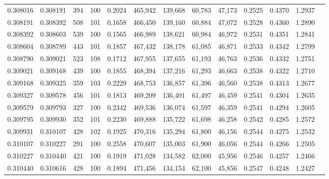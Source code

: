 \begin{tabular}{rrrrrrrrrrrrr}
0.308016 & 0.308191 &   394 & 100 &                                     0.2024 & 465,942 & 139,668 &  60,783 &  47,173 & 0.2525 & 0.4370 & 1.2937 \\
0.308191 & 0.308392 &   508 & 101 &                                     0.1658 & 466,450 & 139,160 &  60,884 &  47,072 & 0.2528 & 0.4360 & 1.2890 \\
0.308392 & 0.308603 &   539 & 100 &                                     0.1565 & 466,989 & 138,621 &  60,984 &  46,972 & 0.2531 & 0.4351 & 1.2841 \\
0.308604 & 0.308789 &   443 & 101 &                                     0.1857 & 467,432 & 138,178 &  61,085 &  46,871 & 0.2533 & 0.4342 & 1.2799 \\
0.308790 & 0.309021 &   523 & 108 &                                     0.1712 & 467,955 & 137,655 &  61,193 &  46,763 & 0.2536 & 0.4332 & 1.2751 \\
0.309021 & 0.309168 &   439 & 100 &                                     0.1855 & 468,394 & 137,216 &  61,293 &  46,663 & 0.2538 & 0.4322 & 1.2710 \\
0.309168 & 0.309325 &   359 & 103 &                                     0.2229 & 468,753 & 136,857 &  61,396 &  46,560 & 0.2538 & 0.4313 & 1.2677 \\
0.309327 & 0.309578 &   456 & 101 &                                     0.1813 & 469,209 & 136,401 &  61,497 &  46,459 & 0.2541 & 0.4304 & 1.2635 \\
0.309579 & 0.309793 &   327 & 100 &                                     0.2342 & 469,536 & 136,074 &  61,597 &  46,359 & 0.2541 & 0.4294 & 1.2605 \\
0.309795 & 0.309930 &   352 & 101 &                                     0.2230 & 469,888 & 135,722 &  61,698 &  46,258 & 0.2542 & 0.4285 & 1.2572 \\
0.309931 & 0.310107 &   428 & 102 &                                     0.1925 & 470,316 & 135,294 &  61,800 &  46,156 & 0.2544 & 0.4275 & 1.2532 \\
0.310107 & 0.310227 &   291 & 100 &                                     0.2558 & 470,607 & 135,003 &  61,900 &  46,056 & 0.2544 & 0.4266 & 1.2505 \\
0.310227 & 0.310440 &   421 & 100 &                                     0.1919 & 471,028 & 134,582 &  62,000 &  45,956 & 0.2546 & 0.4257 & 1.2466 \\
0.310440 & 0.310616 &   428 & 100 &                                     0.1894 & 471,456 & 134,154 &  62,100 &  45,856 & 0.2547 & 0.4248 & 1.2427 \\

\end{tabular}

